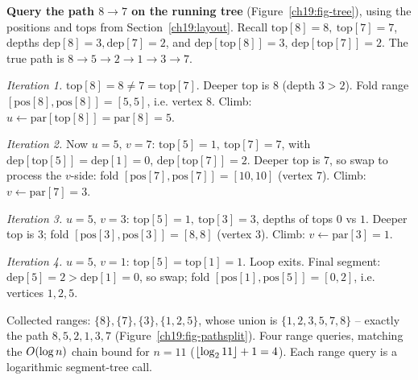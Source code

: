 \begin{labbox}
\textbf{Query the path $8 \to 7$ on the running tree} (Figure~\ref{ch19:fig-tree}), using the
positions and tops from Section~\ref{ch19:layout}. Recall
$\mathrm{top}[8]=8,\ \mathrm{top}[7]=7$, depths
$\mathrm{dep}[8]=3,\mathrm{dep}[7]=2$, and
$\mathrm{dep}[\mathrm{top}[8]]=3$, $\mathrm{dep}[\mathrm{top}[7]]=2$.
The true path is $8\!\to\!5\!\to\!2\!\to\!1\!\to\!3\!\to\!7$.

\emph{Iteration 1.} $\mathrm{top}[8]=8\ne 7=\mathrm{top}[7]$. Deeper top is $8$ (depth $3>2$). Fold
range $[\mathrm{pos}[8],\mathrm{pos}[8]]=[5,5]$, i.e. vertex $8$. Climb:
$u\gets \mathrm{par}[\mathrm{top}[8]]=\mathrm{par}[8]=5$.

\emph{Iteration 2.} Now $u=5,\,v=7$: $\mathrm{top}[5]=1,\ \mathrm{top}[7]=7$, with
$\mathrm{dep}[\mathrm{top}[5]]=\mathrm{dep}[1]=0$, $\mathrm{dep}[\mathrm{top}[7]]=2$.
Deeper top is $7$, so swap to process the $v$-side: fold
$[\mathrm{pos}[7],\mathrm{pos}[7]]=[10,10]$ (vertex $7$). Climb:
$v\gets \mathrm{par}[7]=3$.

\emph{Iteration 3.} $u=5,\,v=3$: $\mathrm{top}[5]=1,\ \mathrm{top}[3]=3$,
depths of tops $0$ vs $1$. Deeper top is $3$; fold $[\mathrm{pos}[3],\mathrm{pos}[3]]=[8,8]$ (vertex
$3$). Climb: $v\gets \mathrm{par}[3]=1$.

\emph{Iteration 4.} $u=5,\,v=1$: $\mathrm{top}[5]=\mathrm{top}[1]=1$. Loop exits. Final segment:
$\mathrm{dep}[5]=2 > \mathrm{dep}[1]=0$, so swap; fold
$[\mathrm{pos}[1],\mathrm{pos}[5]]=[0,2]$, i.e. vertices $1,2,5$.

Collected ranges: $\{8\},\{7\},\{3\},\{1,2,5\}$, whose union is
$\{1,2,3,5,7,8\}$ -- exactly the path $8,5,2,1,3,7$ (Figure~\ref{ch19:fig-pathsplit}). Four range
queries, matching the
$O(\log n)$ chain bound for $n=11$ ($\lfloor\log_2 11\rfloor+1=4$). Each range query is a logarithmic
segment-tree call.
\end{labbox}

